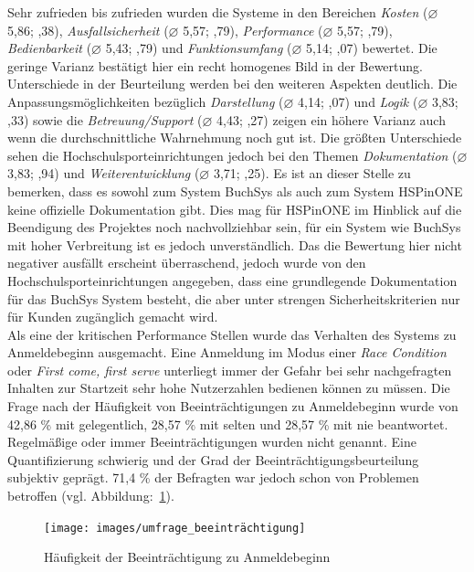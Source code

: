 Sehr zufrieden bis zufrieden wurden die Systeme in den Bereichen \textit{Kosten} ($\varnothing$ 5,86; ,38), \textit{Ausfallsicherheit} ($\varnothing$ 5,57; ,79), \textit{Performance} ($\varnothing$ 5,57; ,79), \textit{Bedienbarkeit} ($\varnothing$ 5,43; ,79) und \textit{Funktionsumfang} ($\varnothing$ 5,14; ,07) bewertet. Die geringe Varianz bestätigt hier ein recht homogenes Bild in der Bewertung.
\\
Unterschiede in der Beurteilung werden bei den weiteren Aspekten deutlich. Die Anpassungsmöglichkeiten bezüglich \textit{Darstellung} ($\varnothing$ 4,14; ,07) und \textit{Logik} ($\varnothing$ 3,83; ,33) sowie die \textit{Betreuung/Support} ($\varnothing$ 4,43; ,27) zeigen ein höhere Varianz auch wenn die durchschnittliche Wahrnehmung noch gut ist. Die größten Unterschiede sehen die Hochschulsporteinrichtungen jedoch bei den Themen \textit{Dokumentation} ($\varnothing$ 3,83; ,94) und \textit{Weiterentwicklung} ($\varnothing$ 3,71; ,25). Es ist an dieser Stelle zu bemerken, dass es sowohl zum System BuchSys als auch zum System HSPinONE keine offizielle Dokumentation gibt. Dies mag für HSPinONE im Hinblick auf die Beendigung des Projektes noch nachvollziehbar sein, für ein System wie BuchSys mit hoher Verbreitung ist es jedoch unverständlich. Das die Bewertung hier nicht negativer ausfällt erscheint überraschend, jedoch wurde von den Hochschulsporteinrichtungen angegeben, dass eine grundlegende Dokumentation für das BuchSys System besteht, die aber unter strengen Sicherheitskriterien nur für Kunden zugänglich gemacht wird.
\\
Als eine der kritischen Performance Stellen wurde das Verhalten des Systems zu Anmeldebeginn ausgemacht. Eine Anmeldung im Modus einer \textit{Race Condition} oder \textit{First come, first serve} unterliegt immer der Gefahr bei sehr nachgefragten Inhalten zur Startzeit sehr hohe Nutzerzahlen bedienen können zu müssen. Die Frage nach der Häufigkeit von Beeinträchtigungen zu Anmeldebeginn wurde von 42,86 \% mit gelegentlich, 28,57 \% mit selten und 28,57 \% mit nie beantwortet. Regelmäßige oder immer Beeinträchtigungen wurden nicht genannt. Eine Quantifizierung schwierig und der Grad der Beeinträchtigungsbeurteilung subjektiv geprägt. 71,4 \% der Befragten war jedoch schon von Problemen betroffen (vgl. Abbildung:~\ref{fig:Umfrage_beeinträchtigung}).
	\begin{figure}[h]
		\centering
		\texttt{[image: images/umfrage\_beeinträchtigung]}
		\caption{Häufigkeit der Beeinträchtigung zu Anmeldebeginn}
		\label{fig:Umfrage_beeinträchtigung}
	\end{figure}

